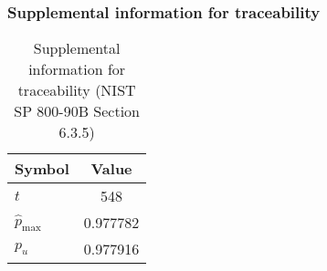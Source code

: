 \documentclass[a3paper,xelatex,english]{bxjsarticle}
\begin{document}
\subsubsection{Supplemental information for traceability}
\renewcommand{\arraystretch}{1.8}
\begin{table}[h]
\caption{Supplemental information for traceability (NIST SP 800-90B Section 6.3.5)}
\begin{center}
\begin{tabular}{|l|c|}
\hline 
\rowcolor{anotherlightblue} %
Symbol				& Value \\ \hline 
$t$				&      548\\ \hline 
$\hat{p}_{\textrm{max}}$ 			& 0.977782\\ \hline
$p_u$				& 0.977916\\ \hline
\end{tabular}
\end{center}
\end{table}
\renewcommand{\arraystretch}{1.4}
\clearpage
\end{document}
